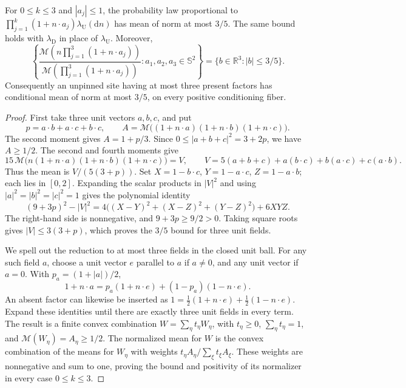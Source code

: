 \begin{lemma}\label{l:35}
For \(0\le k\le3\) and \(|a_j|\le1\), the probability law proportional to
\(\prod_{j=1}^k(1+n\cdot a_j)\lambda_{\mathrm U}(\mathrm dn)\)
has mean of norm at most \(3/5\). The same bound holds with
\(\lambda_{\mathrm D}\) in place of \(\lambda_{\mathrm U}\).
Moreover,
\[
 \left\{
 \frac{\mathcal M\!\left(n\prod_{j=1}^3(1+n\cdot a_j)\right)}
      {\mathcal M\!\left(\prod_{j=1}^3(1+n\cdot a_j)\right)}
       :a_1,a_2,a_3\in\mathbb S^2
 \right\}=\{b\in\mathbb R^3:|b|\le3/5\}.
\]
Consequently an unpinned site having at most three present factors
has conditional mean of norm at most \(3/5\), on every positive
conditioning fiber.
\end{lemma}

\begin{proof}
First take three unit vectors \(a,b,c\), and put
\[
 p=a\cdot b+a\cdot c+b\cdot c,\qquad
 A=\mathcal M\bigl((1+n\cdot a)(1+n\cdot b)(1+n\cdot c)\bigr).
\]
The second moment gives \(A=1+p/3\). Since
\(0\le|a+b+c|^2=3+2p\), we have \(A\ge1/2\).
The second and fourth moments give
\[
 15\,\mathcal M\bigl(n(1+n\cdot a)(1+n\cdot b)(1+n\cdot c)\bigr)
 =V,\qquad
 V=5(a+b+c)+a(b\cdot c)+b(a\cdot c)+c(a\cdot b).
\]
Thus the mean is \(V/(5(3+p))\). Set
\(X=1-b\cdot c\), \(Y=1-a\cdot c\), \(Z=1-a\cdot b\);
each lies in \([0,2]\). Expanding the scalar products in \(|V|^2\)
and using \(|a|^2=|b|^2=|c|^2=1\) gives the polynomial identity
\[
 (9+3p)^2-|V|^2
 =4\bigl((X-Y)^2+(X-Z)^2+(Y-Z)^2\bigr)+6XYZ.
\]
The right-hand side is nonnegative, and \(9+3p\ge9/2>0\).
Taking square roots gives \(|V|\le3(3+p)\), which proves the
\(3/5\) bound for three unit fields.

We spell out the reduction to at most three fields in the closed
unit ball. For any such field \(a\), choose a unit vector \(e\)
parallel to \(a\) if \(a\ne0\), and any unit vector if \(a=0\).
With \(p_a=(1+|a|)/2\),
\[
 1+n\cdot a=p_a(1+n\cdot e)+(1-p_a)(1-n\cdot e).
\]
An absent factor can likewise be inserted as
\(1=\tfrac12(1+n\cdot e)+\tfrac12(1-n\cdot e)\).
Expand these identities until there are exactly three unit fields
in every term. The result is a finite convex combination
\(W=\sum_\eta t_\eta W_\eta\), with \(t_\eta\ge0\),
\(\sum_\eta t_\eta=1\), and
\(\mathcal M(W_\eta)=A_\eta\ge1/2\). The normalized mean for \(W\)
is the convex combination of the means for \(W_\eta\) with weights
\(t_\eta A_\eta/\sum_\xi t_\xi A_\xi\).
These weights are nonnegative and sum to one, proving the bound
and positivity of its normalizer in every case \(0\le k\le3\).


\end{proof}
